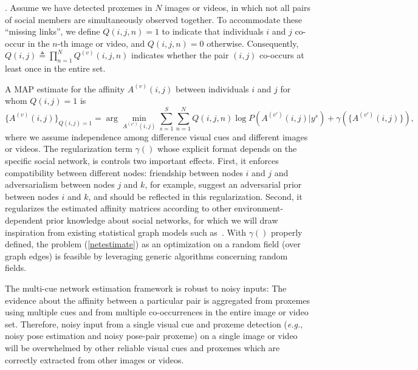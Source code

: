 . Assume we have detected proxemes in $N$ images or videos, in which not all pairs of social members are simultaneously observed together. To accommodate these ``missing links'', we define $Q(i,j,n)=1$ to indicate that individuals $i$ and $j$ co-occur in the $n$-th image or video, and $Q(i,j,n)=0$ otherwise. Consequently, $Q(i,j)\triangleq\prod_{n=1}^{N}Q^{(v)}(i,j,n)$ indicates whether the pair $(i, j)$ co-occurs at least once in the entire set.


A MAP estimate for the affinity $A^{(v)}(i,j)$ between individuals $i$ and $j$ for whom $Q (i,j)=1$ is
\begin{equation}
\{A^{(v)}(i,j)\}_{Q(i,j)=1}=\arg\!\!\!\!\!\min_{A^{(v')}(i,j)}\sum_{s=1}^{S}\sum_{n=1}^{N}Q(i,j,n)\log P(A^{(v')}(i,j)|y^s)+\gamma(\{A^{(v')}(i,j)\}),
\label{netestimate}
\end{equation}
where we assume independence among difference visual cues and different images or videos. The regularization term $\gamma()$ whose explicit format depends on the specific social network, is controls two important effects. First, it enforces compatibility between different nodes: friendship between nodes $i$ and $j$ and adversarialism between nodes $j$ and $k$, for example, suggest an adversarial prior between nodes $i$ and $k$, and should be reflected in this regularization. Second, it regularizes the estimated affinity matrices according to other environment-dependent prior knowledge about social networks, for which we will draw inspiration from existing statistical graph models such as~\cite{Goldenberg}. With $\gamma()$ properly defined, the problem (\ref{netestimate}) as an optimization on a random field (over graph edges) is feasible by leveraging generic algorithms concerning random fields.

The multi-cue network estimation framework is robust to noisy inputs: The evidence about the affinity between a particular pair is aggregated from proxemes using multiple cues and from multiple co-occurrences in the entire image or video set. Therefore, noisy input from a single visual cue and proxeme detection (\emph{e.g.}, noisy pose estimation and noisy pose-pair proxeme) on a single image or video will be overwhelmed by other reliable visual cues and proxemes which are correctly extracted from other images or videos.  





